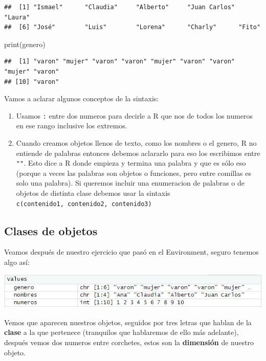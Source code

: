 \documentclass[
]{book}
\newenvironment{Shaded}{\begin{snugshade}}{\end{snugshade}}
\newcommand{\FunctionTok}[1]{\textcolor[rgb]{0.00,0.00,0.00}{#1}}
\newcommand{\NormalTok}[1]{#1}
\providecommand{\tightlist}{%
  \setlength{\itemsep}{0pt}\setlength{\parskip}{0pt}}
\begin{document}
\begin{verbatim}
##  [1] "Ismael"      "Claudia"     "Alberto"     "Juan Carlos" "Laura"      
##  [6] "José"        "Luis"        "Lorena"      "Charly"      "Fito"
\end{verbatim}

\begin{Shaded}
\begin{Highlighting}[]
\FunctionTok{print}\NormalTok{(genero)}
\end{Highlighting}
\end{Shaded}

\begin{verbatim}
##  [1] "varon" "mujer" "varon" "varon" "mujer" "varon" "varon" "mujer" "varon"
## [10] "varon"
\end{verbatim}

Vamos a aclarar algunos conceptos de la sintaxis:

\begin{enumerate}
\def\labelenumi{\arabic{enumi}.}
\tightlist
\item
  Usamos \texttt{:} entre dos numeros para decirle a R que nos de todos los numeros en ese rango inclusive los extremos.
\item
  Cuando creamos objetos llenos de texto, como los nombres o el genero, R no entiende de palabras entonces debemos aclararlo para eso los escribimos entre \texttt{""}. Esto dice a R donde empieza y termina una palabra y que es sólo eso (porque a veces las palabras son objetos o funciones, pero entre comillas es solo una palabra). Si queremos incluir una enumeracion de palabras o de objetos de distinta clase debemos usar la sintaxis \texttt{c(contenido1,\ contenido2,\ contenido3)}
\end{enumerate}

\hypertarget{clases-de-objetos}{%
\subsection{Clases de objetos}\label{clases-de-objetos}}

Veamos después de nuestro ejercicio que pasó en el Environment, seguro tenemos algo así:

\includegraphics[width=8.56in]{img/Rstudiofig4}

Vemos que aparecen nuestros objetos, seguidos por tres letras que hablan de la \textbf{clase} a la que pertenece (tranquilos que hablaremos de ello más adelante), después vemos dos numeros entre corchetes, estos son la \textbf{dimensión} de nuestro objeto.
\end{document}
